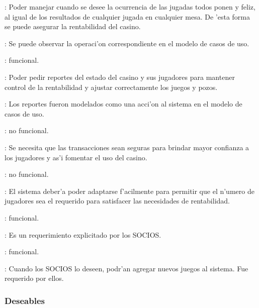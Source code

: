 : Poder manejar cuando se desee la ocurrencia de las jugadas todos ponen y feliz, al igual de los resultados de cualquier jugada en cualquier mesa. De 'esta forma se puede asegurar la rentabilidad del casino.

: Se puede observar la operaci'on correspondiente en el modelo de casos de uso.



: funcional.

: Poder pedir reportes del estado del casino y sus jugadores para mantener control de la rentabilidad y ajustar correctamente los juegos y pozos.

: Los reportes fueron modelados como una acci'on al sistema en el modelo de casos de uso.



: no funcional.

: Se necesita que las transacciones sean seguras para brindar mayor confianza a los jugadores y as'i fomentar el uso del casino.




: no funcional.

: El sistema deber'a poder adaptarse f'acilmente para permitir que el n'umero de jugadores sea el requerido para satisfacer las necesidades de rentabilidad.





: funcional.

:  Es un requerimiento explicitado por los SOCIOS.


	
	
: funcional.

: Cuando los SOCIOS lo deseen, podr'an agregar nuevos juegos al sistema. Fue requerido por ellos.





\subsubsection{Deseables}


